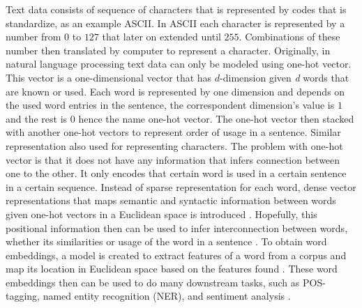     Text data consists of sequence of characters that is represented
    by codes that is standardize, as an example ASCII. In ASCII each
    character is represented by a number from $0$ to $127$ that later
    on extended until $255$. Combinations of these number then
    translated by computer to represent a character. Originally, in
    natural language processing text data can only be modeled using
    one-hot vector. This vector is a one-dimensional vector that has
    $d$-dimension given \textit{d} words that are known or used. Each
    word is represented by one dimension and depends on the used word
    entries in the sentence, the correspondent dimension's value is
    $1$ and the rest is $0$ hence the name one-hot vector. The one-hot
    vector then stacked with another one-hot vectors to represent
    order of usage in a sentence. Similar representation also used for
    representing characters. The problem with one-hot vector is that
    it does not have any information that infers connection between
    one to the other. It only encodes that certain word is used in a
    certain sentence in a certain sequence. Instead of sparse
    representation for each word, dense vector representations that
    maps semantic and syntactic information between words given
    one-hot vectors in a Euclidean space is introduced
    \citep{wordembedding2017yang, Distributed2013mikolov}. Hopefully,
    this positional information then can be used to infer
    interconnection between words, whether its similarities or usage
    of the word in a sentence \citep{distributional1954harris}. To
    obtain word embeddings, a model is created to extract features of
    a word from a corpus and map its location in Euclidean space based
    on the features found \citep{Distributed2013mikolov,
    polyglot2013alrfou, dict2vect2017tissier}. These word embeddings
    then can be used to do many downstream tasks, such as POS-tagging,
    named entity recognition (NER), and sentiment analysis
    \citep{finding2015ling, neural2016lample}. 
    
